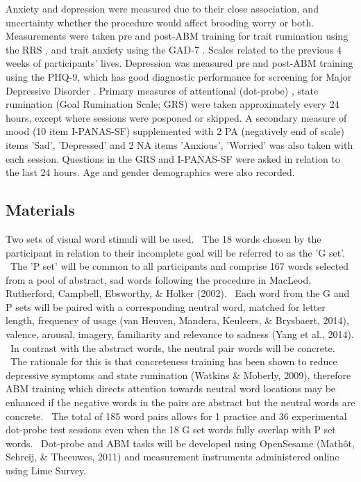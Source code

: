 \documentclass[man,a4paper,biblatex]{apa6}
\begin{document}
Anxiety and depression were measured due to their close association, and
uncertainty whether the procedure would affect brooding  worry or both. Measurements
were taken pre and post-ABM training for trait rumination using the RRS
\parencite{treynor_rumination_2003}, and trait anxiety using the GAD-7
\parencite{spitzer_rl_brief_2006}. Scales related to the previous 4
weeks of participants' lives.  Depression was measured pre and post-ABM
training using the PHQ-9, which has good diagnostic performance for
screening for Major Depressive Disorder \parencite{manea_diagnostic_2015}
. Primary measures
of attentional (dot-probe) \parencite{macleod_attentional_1986}, state
rumination (Goal Rumination Scale; GRS) \parencite{schultheiss_role_2008}
were taken approximately every 24 hours, except where sessions were
posponed or skipped.  A secondary measure of mood (10 item I-PANAS-SF)
\parencite{mackinnon_short_1999} supplemented with 2 PA (negatively end of
scale) items 'Sad', 'Depressed' and 2 NA items 'Anxious', 'Worried' was
also taken with each session.  Questions in the GRS and I-PANAS-SF were
asked in relation to the last 24 hours.  Age and gender demographics were also recorded.

\subsection{Materials}

Two sets of visual word stimuli will be used. \ The 18 words chosen by
the participant in relation to their incomplete goal will be referred
to as the 'G set'. \ The 'P set' will be common to all participants
and comprise 167 words selected from a pool of abstract, sad words
following the procedure in MacLeod, Rutherford, Campbell, Ebsworthy, \&
Holker (2002). \ Each word from the G and P sets will be paired with
a corresponding neutral word, matched for letter length, frequency of
usage (van Heuven, Mandera, Keuleers, \& Brysbaert, 2014), valence,
arousal, imagery, familiarity and relevance to sadness (Yang et al.,
2014). \ In contrast with the abstract words, the neutral pair words will
be concrete. \ The rationale for this is that concreteness training has
been shown to reduce depressive symptoms and state rumination (Watkins \&
Moberly, 2009), therefore ABM training which directs attention towards
neutral word locations may be enhanced if the negative words in the
pairs are abstract but the neutral words are concrete. \ The total of
185 word pairs allows for 1 practice and 36 experimental dot-probe test
sessions even when the 18 G set words fully overlap with P set words. \
Dot-probe and ABM tasks will be developed using OpenSesame (Math\^ot,
Schreij, \& Theeuwes, 2011) and measurement instruments administered
online using Lime Survey.
\end{document}
